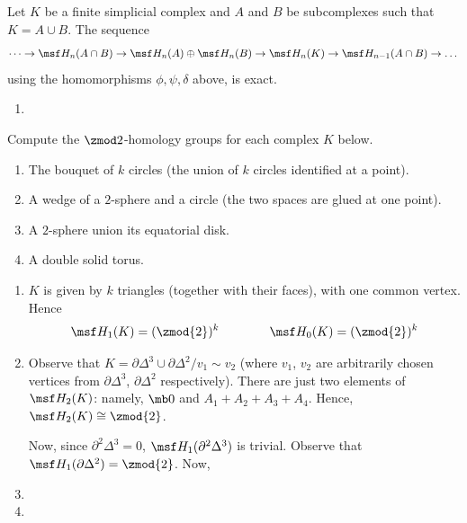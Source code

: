 \begin{problem}[16.37]
  Let $K$ be a finite simplicial complex and $A$ and $B$ be
  subcomplexes such that $K=A\cup B$. The sequence
  \[
    \dots \to \msf H_n(A\cap B) \to \msf H_n(A)\oplus \msf H_n(B) \to
    \msf H_n(K) \to \msf H_{n-1}(A\cap B) \to \dots
  \]
  using the homomorphisms $\phi,\psi,\delta$ above, is exact.
\end{problem}

\begin{enumerate}
  \item
\end{enumerate}

\begin{problem}[16.39]
  Compute the $\zmod 2$-homology groups for each complex $K$ below.
  \begin{enumerate}
    \item The bouquet of $k$ circles (the union of $k$ circles
      identified at a point).
    \item A wedge of a $2$-sphere and a circle (the two spaces are
      glued at one point).
    \item A $2$-sphere union its equatorial disk.
    \item A double solid torus.
  \end{enumerate}
\end{problem}
\begin{solution}
  \begin{enumerate}
    \item $K$ is given by $k$ triangles (together with their faces),
      with one common vertex. Hence
      \[
        \msf H_1(K) = (\zmod{2})^k \qquad\qquad \msf H_0(K) =
        (\zmod{2})^k
      \]
    \item Observe that $K = \partial \Delta^3 \cup \partial \Delta^2 /
      v_1 \sim v_2$ (where $v_1$, $v_2$ are arbitrarily chosen
      vertices from $\partial \Delta^3$, $\partial \Delta^2$
      respectively). There are just two elements of $\msf H_2(K)$:
      namely, $\mb 0$ and $A_1 + A_2 + A_3 + A_4$. Hence, $\msf H_2(K)
      \cong \zmod{2}$.

      Now, since $\partial^2 \Delta^3 = 0$, $\msf H_1(\partial^2
      \Delta^3)$ is trivial. Observe that $\msf H_1(\partial \Delta^2)
      = \zmod{2}$. Now,
    \item
    \item
  \end{enumerate}
\end{solution}


